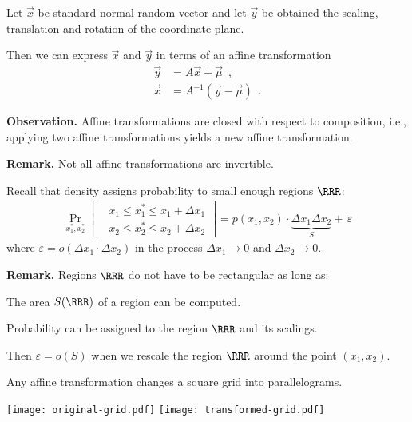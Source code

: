 \documentclass[landscape,footrule]{foils}
\newcommand{\lastline}{\vspace*{-2ex}}
\begin{document}
Let $\vec{x}$ be standard normal random vector and let $\vec{y}$ be obtained the scaling,  translation and rotation of the coordinate plane.

Then we can express $\vec{x}$ and $\vec{y}$ in terms of an affine transformation
\begin{align*}
  \vec{y}&=A\vec{x}+\vec{\mu} \enspace,\\
  \vec{x}&=A^{-1}(\vec{y}-\vec{\mu}) \enspace.
\end{align*}

\textbf{Observation.}
Affine transformations are closed with respect to composition, i.e., applying two affine transformations yields a new affine transformation. \vspace*{2ex}

\textbf{Remark.} Not all affine transformations are invertible.\lastline




Recall that density assigns probability to small enough regions $\RRR$:
\begin{align*}
\Pr_{x_1^*,x_2^*}
\left[\begin{aligned}
   &x_1\leq x_1^*\leq x_1+\Delta x_1\\ 
   &x_2\leq x_2^*\leq x_2+\Delta x_2
\end{aligned}\right]= p(x_1,x_2)\cdot\underbrace{\Delta x_1\Delta x_2}_S +\, \varepsilon
\end{align*}
where $\varepsilon=o(\Delta x_1\cdot\Delta x_2)$ in the process $\Delta x_1\to 0$ and $\Delta x_2\to 0$.\vspace*{1cm}

\textbf{Remark.} Regions $\RRR$ do not have to be rectangular as long as:
\begin{triangles}
\item The area $S(\RRR)$ of a region can be computed.  
\item Probability can be assigned to the region $\RRR$ and its scalings.
\end{triangles}
Then $\varepsilon=o(S)$ when we rescale the region $\RRR$ around the point $(x_1,x_2)$.



Any affine transformation changes a square grid into parallelograms. \vspace*{-1cm}
\begin{center}
\texttt{[image: original-grid.pdf]}
\texttt{[image: transformed-grid.pdf]}
\end{center}\vspace*{-1cm}
\end{document}
